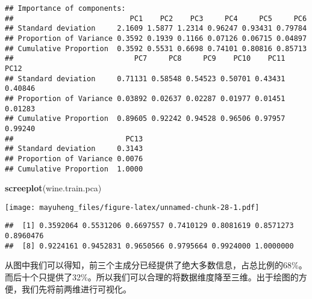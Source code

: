 \documentclass[]{article}
\newenvironment{Shaded}{\begin{snugshade}}{\end{snugshade}}
\newcommand{\ControlFlowTok}[1]{\textcolor[rgb]{0.13,0.29,0.53}{\textbf{#1}}}
\newcommand{\DataTypeTok}[1]{\textcolor[rgb]{0.13,0.29,0.53}{#1}}
\newcommand{\DecValTok}[1]{\textcolor[rgb]{0.00,0.00,0.81}{#1}}
\newcommand{\KeywordTok}[1]{\textcolor[rgb]{0.13,0.29,0.53}{\textbf{#1}}}
\newcommand{\NormalTok}[1]{#1}
\newcommand{\OperatorTok}[1]{\textcolor[rgb]{0.81,0.36,0.00}{\textbf{#1}}}
\begin{document}
\begin{verbatim}
## Importance of components:
##                           PC1    PC2    PC3     PC4     PC5     PC6
## Standard deviation     2.1609 1.5877 1.2314 0.96247 0.93431 0.79784
## Proportion of Variance 0.3592 0.1939 0.1166 0.07126 0.06715 0.04897
## Cumulative Proportion  0.3592 0.5531 0.6698 0.74101 0.80816 0.85713
##                            PC7     PC8     PC9    PC10    PC11    PC12
## Standard deviation     0.71131 0.58548 0.54523 0.50701 0.43431 0.40846
## Proportion of Variance 0.03892 0.02637 0.02287 0.01977 0.01451 0.01283
## Cumulative Proportion  0.89605 0.92242 0.94528 0.96506 0.97957 0.99240
##                          PC13
## Standard deviation     0.3143
## Proportion of Variance 0.0076
## Cumulative Proportion  1.0000
\end{verbatim}

\begin{Shaded}
\begin{Highlighting}[]
\KeywordTok{screeplot}\NormalTok{(wine.train.pca)}
\end{Highlighting}
\end{Shaded}

\texttt{[image: mayuheng\_files/figure-latex/unnamed-chunk-28-1.pdf]}

\begin{Shaded}
\end{Shaded}

\begin{verbatim}
##  [1] 0.3592064 0.5531206 0.6697557 0.7410129 0.8081619 0.8571273 0.8960476
##  [8] 0.9224161 0.9452831 0.9650566 0.9795664 0.9924000 1.0000000
\end{verbatim}

从图中我们可以得知，前三个主成分已经提供了绝大多数信息，占总比例的68\%。而后十个只提供了32\%。所以我们可以合理的将数据维度降至三维。出于绘图的方便，我们先将前两维进行可视化。

\begin{Shaded}
\end{Shaded}
\end{document}
